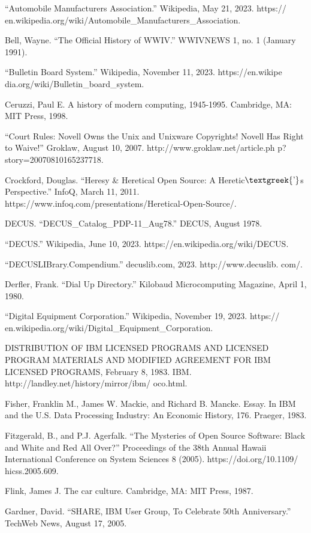 \documentclass{article}
\begin{document}
“Automobile Manufacturers Association.” Wikipedia, May 21, 2023. https://
en.wikipedia.org/wiki/Automobile\_Manufacturers\_Association. 

Bell, Wayne. “The Official History of WWIV.” WWIVNEWS 1, no. 1 (January 1991). 

“Bulletin Board System.” Wikipedia, November 11, 2023. https://en.wikipe dia.org/wiki/Bulletin\_board\_system. 

Ceruzzi, Paul E. A history of modern computing, 1945-1995. Cambridge, MA: MIT Press, 1998.

“Court Rules: Novell Owns the Unix and Unixware Copyrights! Novell Has Right to Waive!” Groklaw, August 10, 2007.
http://www.groklaw.net/article.ph p?story=20070810165237718. 

Crockford, Douglas. “Heresy \& Heretical Open Source: A Heretic$\text{\textgreek{’}}$s Perspective.” InfoQ, March 11,
2011. https://www.infoq.com/presentations/Heretical-Open-Source/. 

DECUS. “DECUS\_Catalog\_PDP-11\_Aug78.” DECUS, August 1978. 

“DECUS.” Wikipedia, June 10, 2023. https://en.wikipedia.org/wiki/DECUS. 

“DECUSLIBrary.Compendium.” decuslib.com, 2023. http://www.decuslib. com/. 

Derfler, Frank. “Dial Up Directory.” Kilobaud Microcomputing Magazine, April 1, 1980. 

“Digital Equipment Corporation.” Wikipedia, November 19, 2023. https://
en.wikipedia.org/wiki/Digital\_Equipment\_Corporation. 

DISTRIBUTION OF IBM LICENSED PROGRAMS AND LICENSED PROGRAM MATERIALS AND MODIFIED AGREEMENT FOR IBM LICENSED PROGRAMS,
February 8, 1983. IBM. http://landley.net/history/mirror/ibm/ oco.html. 

Fisher, Franklin M., James W. Mackie, and Richard B. Mancke. Essay. In IBM and the U.S. Data Processing Industry: An
Economic History, 176. Praeger, 1983. 

Fitzgerald, B., and P.J. Agerfalk. “The Mysteries of Open Source Software: Black and White and Red All Over?”
Proceedings of the 38th Annual Hawaii International Conference on System Sciences 8 (2005). https://doi.org/10.1109/
hicss.2005.609. 

Flink, James J. The car culture. Cambridge, MA: MIT Press, 1987. 

Gardner, David. “SHARE, IBM User Group, To Celebrate 50th Anniversary.” TechWeb News, August 17, 2005. 
\end{document}
